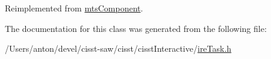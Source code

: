 Reimplemented from \hyperlink{classmts_component_aaf28f0262b44eb6866e10089a02fa6e4}{mts\+Component}.



The documentation for this class was generated from the following file\+:\begin{DoxyCompactItemize}
\item 
/\+Users/anton/devel/cisst-\/saw/cisst/cisst\+Interactive/\hyperlink{ire_task_8h}{ire\+Task.\+h}\end{DoxyCompactItemize}
